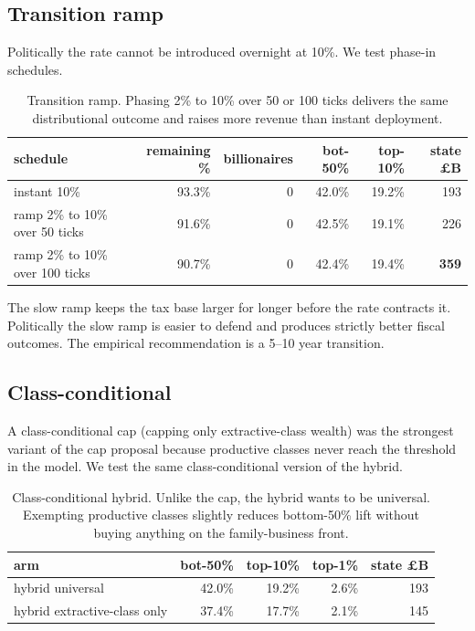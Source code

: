 \documentclass[11pt]{article}
\begin{document}
\subsection{Transition ramp}

Politically the rate cannot be introduced overnight at 10\%.  We
test phase-in schedules.

\begin{table}[h]
\centering
\small
\caption{Transition ramp.  Phasing 2\% to 10\% over 50 or 100
ticks delivers the same distributional outcome and raises more
revenue than instant deployment.}
\label{tab:ramp}
\begin{tabular}{lrrrrr}
\toprule
schedule & remaining \% & billionaires & bot-50\% & top-10\% & state \pounds B \\
\midrule
instant 10\%                  & 93.3\% & 0 & 42.0\% & 19.2\% & 193 \\
ramp 2\% to 10\% over 50 ticks  & 91.6\% & 0 & 42.5\% & 19.1\% & 226 \\
ramp 2\% to 10\% over 100 ticks & 90.7\% & 0 & 42.4\% & 19.4\% & \textbf{359} \\
\bottomrule
\end{tabular}
\end{table}

The slow ramp keeps the tax base larger for longer before the
rate contracts it.  Politically the slow ramp is easier to defend
and produces strictly better fiscal outcomes.  The empirical
recommendation is a 5--10 year transition.

\subsection{Class-conditional}

A class-conditional cap (capping only extractive-class wealth) was
the strongest variant of the cap proposal because productive
classes never reach the threshold in the model.  We test the same
class-conditional version of the hybrid.

\begin{table}[h]
\centering
\small
\caption{Class-conditional hybrid.  Unlike the cap, the hybrid
wants to be universal.  Exempting productive classes slightly
reduces bottom-50\% lift without buying anything on the
family-business front.}
\label{tab:classcond}
\begin{tabular}{lrrrr}
\toprule
arm & bot-50\% & top-10\% & top-1\% & state \pounds B \\
\midrule
hybrid universal               & 42.0\% & 19.2\% & 2.6\% & 193 \\
hybrid extractive-class only   & 37.4\% & 17.7\% & 2.1\% & 145 \\
\bottomrule
\end{tabular}
\end{table}
\end{document}
